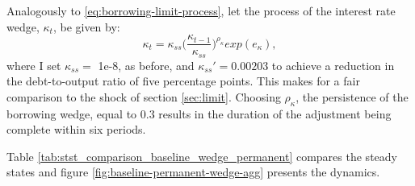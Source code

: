 \documentclass[12pt]{article} %
\numberwithin{equation}{section} %
\numberwithin{figure}{section}
\numberwithin{table}{section}
\begin{document}
Analogously to \eqref{eq:borrowing-limit-process}, let the process of the interest rate wedge, $\kappa_t$, be given by:
\begin{equation}
    \kappa_t = \kappa_{ss} \Bigg( \frac{\kappa_{t-1}}{\kappa_{ss}} \Bigg)^{\rho_{\kappa}} exp(e_{\kappa}), \label{eq:wedge-process}
\end{equation}
where I set $\kappa_{ss} =$ 1e-8, as before, and $\kappa_{ss}' = 0.00203$ to achieve a reduction in the debt-to-output ratio of five percentage points. This makes for a fair comparison to the shock of section \ref{sec:limit}. Choosing $\rho_{\kappa}$, the persistence of the borrowing wedge, equal to $0.3$ results in the duration of the adjustment being complete within six periods. 

Table \ref{tab:stst_comparison_baseline_wedge_permanent} compares the steady states and figure \ref{fig:baseline-permanent-wedge-agg} presents the dynamics.
\end{document}
